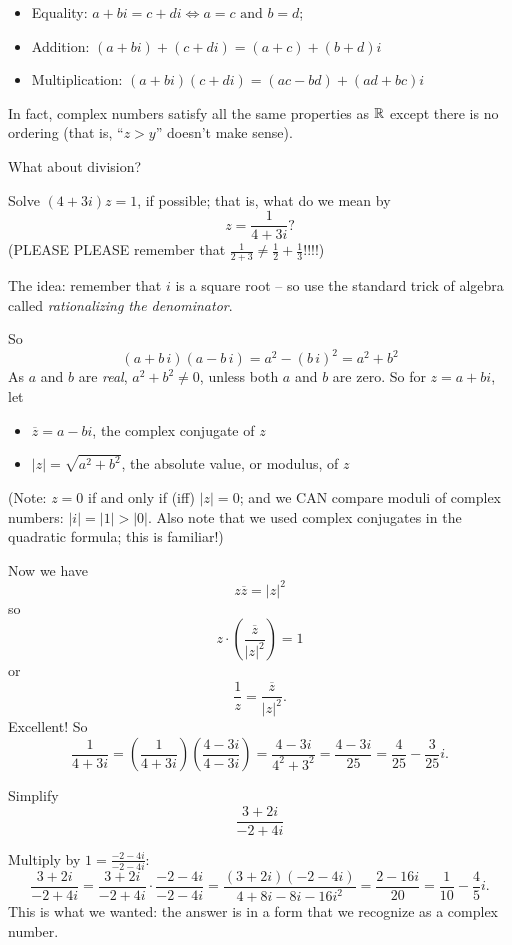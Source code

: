 \begin{itemize}
\item Equality:  $a+bi = c+di \Leftrightarrow \textrm{$a=c$ and $b=d$}$;
\item Addition:  $(a+bi) + (c+di) = (a+c) + (b+d)i$
\item Multiplication:  $(a+bi)(c+di) = (ac-bd) + (ad+bc)i$
\end{itemize}
In fact, complex numbers satisfy all the same properties as
$\mathbb{R}$ except there is no ordering (that is, ``$z>y$'' doesn't 
make sense).  

What about division?

\begin{myprob}
Solve $(4+3i)z = 1$, if possible; that is, what do we mean by
$$
z = \frac{1}{4+3i} ?
$$
(PLEASE PLEASE remember that $\frac{1}{2+3} \neq \frac12 + \frac13$!!!!)


\begin{mysol}
The idea:  remember that $i$ is a square root -- so  use the  standard trick of algebra called \emph{rationalizing the denominator}.

So 
 $$(a+b \, i)(a-b\, i) = a^2-(b\, i)^2 = a^2+b^2$$ As   $a$ and $b$ are \emph{real}, $a^2+ b^2 \neq 0$,
unless both $a$ and $b$ are zero.
So for $z=a+bi$, let 
\begin{itemize}
\item $\overline{z} = a-bi$, the complex conjugate of $z$
\item $\vert z \vert = \sqrt{a^2+b^2}$, the absolute value, or modulus, of $z$
\end{itemize}
(Note:  $z = 0$ if and only if (iff) $\vert z \vert = 0$; and we CAN
compare moduli of complex numbers:  $\vert i \vert = \vert 1 \vert > \vert 0 \vert$.  Also note that we used complex conjugates in the quadratic formula;
this is familiar!)

Now we have
$$
z \overline{z} = \vert z \vert^2
$$
so
$$
z \cdot \left(\frac{\overline{z}}{\vert z \vert^2}\right) = 1
$$
or
$$
\frac{1}{z} = \frac{\overline{z}}{\vert z \vert^2}.
$$
Excellent!  So 
$$
\frac{1}{4+3i} = \left(\frac{1}{4+3i} \right) \left( \frac{4-3i}{4-3i} \right) = \frac{4-3i}{4^2+3^2} = \frac{4-3i}{25} = \frac{4}{25} - \frac{3}{25}i.
$$
\end{mysol}\end{myprob}

 
\begin{myprob}
Simplify
$$
\frac{3+2i}{-2+4i}
$$

\begin{mysol}
Multiply by $1 = \frac{-2-4i}{-2-4i}$:
$$
\frac{3+2i}{-2 + 4i} = \frac{3+2i}{-2 + 4i}\cdot \frac{-2-4i}{-2-4i} =
\frac{(3+2i)(-2-4i)}{4+8i-8i-16i^2} = \frac{2-16i}{20} = \frac{1}{10} - \frac{4}{5}i.
$$
This is what we wanted:  the answer is in a form that we recognize as 
a complex number.
\end{mysol}
\end{myprob}

